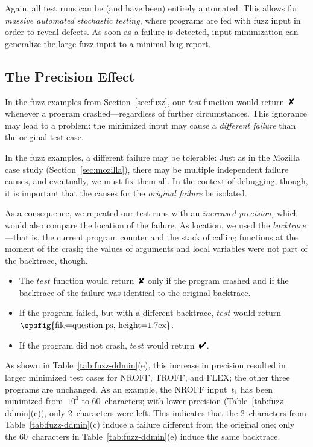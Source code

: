 \documentclass{acm_proc_article-sp}
\newcommand{\FLEX}       {{\small FLEX}\xspace}
\newcommand{\NROFF}      {{\small NROFF}\xspace}
\newcommand{\TROFF}      {{\small TROFF}\xspace}
\newcommand{\PASS}{\text{\ding{52}}\xspace}
\newcommand{\FAIL}{\text{\ding{56}}\xspace}
\newcommand{\UNRESOLVED}{\lower0.1ex\hbox{\epsfig{file=question.ps, 
      height=1.7ex}}}
\newcommand{\test}{\textit{test}\xspace}
\theoremstyle{plain}
\begin{document}
Again, all test runs can be (and have been) entirely automated.  This
allows for \emph{massive automated stochastic testing}, where programs
are fed with fuzz input in order to reveal defects.  As soon as a
failure is detected, input minimization can generalize the large fuzz
input to a minimal bug report.


\subsection{The Precision Effect}
\label{sec:precise-fuzz}

\noindent
In the fuzz examples from Section~\ref{sec:fuzz}, our \test function
would return~$\FAIL$ whenever a program crashed---regardless of
further circumstances.  This ignorance may lead to a problem: the
minimized input may cause a \emph{different failure} than the original
test case.  

In the fuzz examples, a different failure may be tolerable: Just as in
the Mozilla case study (Section~\ref{sec:mozilla}), there may be
multiple independent failure causes, and eventually, we must fix them
all.  In the context of debugging, though, it is important that the
causes for the \emph{original failure} be isolated.

As a consequence, we repeated our test runs with an \emph{increased
  precision,} which would also compare the location of the failure.
As location, we used the \emph{backtrace}---that is, the current
program counter and the stack of calling functions at the moment of
the crash; the values of arguments and local variables were not part
of the backtrace, though.

\begin{itemize}
\item The $\test$ function would return~$\FAIL$ only if the program
  crashed and if the backtrace of the failure was identical to the
  original backtrace.
\item If the program failed, but with a different backtrace, $\test$
  would return $\UNRESOLVED$.
\item If the program did not crash, $\test$ would return~$\PASS$.
\end{itemize}

As shown in Table~\ref{tab:fuzz-ddmin}(e), this increase in precision
resulted in larger minimized test cases for \NROFF, \TROFF, and \FLEX;
the other three programs are unchanged.  As an example, the \NROFF
input~$t_1$ has been minimized from~$10^3$ to 60~characters; with
lower precision (Table~\ref{tab:fuzz-ddmin}(c)), only 2~characters
were left.  This indicates that the 2~characters from
Table~\ref{tab:fuzz-ddmin}(c) induce a failure different from the
original one; only the 60~characters in Table~\ref{tab:fuzz-ddmin}(e)
induce the same backtrace.
\end{document}
